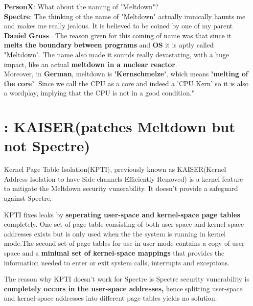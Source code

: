 \documentclass[12pt]{article}
\begin{document}
\begin{appendices}
	\textbf{PersonX}: What about the naming of "Meltdown"?\\
	
	\textbf{Spectre}: The thinking of the name of "Meltdown" actually ironically haunts me and makes me really jealous. It is believed to be coined by one of my parent \textbf{Daniel Gruss} . The reason given for this coining of name was that since it \textbf{melts the boundary} \textbf{between programs} and \textbf{OS} it is aptly called "Meltdown". The name also made it sounds really devastating, with a huge impact, like an actual \textbf{meltdown in a nuclear reactor}.\\
	Moreover, in \textbf{German}, meltdown is \textbf{'Kernschmelze'}, which means \textbf{'melting of the core'}. Since we call the CPU as a core and indeed a 'CPU Kern' so it is also a wordplay, implying that the CPU is not in a good condition."


\section{: KAISER(patches Meltdown but not Spectre)}

Kernel Page Table Isolation(KPTI), previously known as KAISER(Kernel Address Isolation to have Side channels Efficiently Removed) is a kernel feature to mitigate the Meltdown security vunerability. It doesn't provide a safeguard against Spectre.

KPTI fixes leaks by \textbf{seperating user-space and kernel-space page tables} completely. One set of page table consisting of both user-space and kernel-space addresses exists but is only used when the the system is running in kernel mode.The second set of page tables for use in user mode contains a copy of user-space and a \textbf{minimal set of kernel-space mappings} that provides the information needed to enter or exit system calls, interrupts and exceptions.

The reason why KPTI doesn't work for Spectre is Spectre security vunerability is \textbf{completely occurs in the user-space addresses,} hence splitting user-space and kernel-space addresses into different page tables yields no solution.

   
	
\end{appendices}
\end{document}
